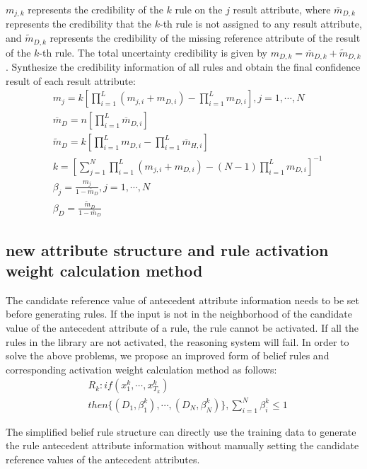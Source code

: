 \documentclass{ieeeaccess}
\begin{document}
$m_{j,k}$ represents the credibility of the $k$ rule on the $j$ result attribute,
where $\overline{m}_{D,k}$ represents the credibility that the $k$-th rule is not assigned to any result attribute,
and $\widetilde{m}_{D,k}$  represents the credibility of the missing reference attribute of the result of the $k$-th rule.
The total uncertainty credibility is given by $m_{D,k}=\overline{m}_{D,k}+\widetilde{m}_{D,k}$.
Synthesize the credibility information of all rules and obtain the final confidence result of each result attribute:
\begin{align}
     & m_j=k[\prod_{i=1}^L(m_{j,i}+m_{D,i})-\prod_{i=1}^Lm_{D,i}],j=1,\cdots,N       \\
     & \overline{m}_D=n[\prod_{i=1}^L\overline{m}_{D,i}]                             \\
     & \widetilde{m}_D=k[\prod_{i=1}^Lm_{D,i}-\prod_{i=1}^L\overline{m}_{H,i}]       \\
     & k=[\sum_{j=1}^N\prod_{i=1}^L(m_{j,i}+m_{D,i})-(N-1)\prod_{i=1}^Lm_{D,i}]^{-1} \\
     & \beta_j=\frac{m_j}{1-\overline{m}_D},j=1,\cdots,N                             \\
     & \beta_D=\frac{\widetilde{m}_D}{1-\overline{m}_D}
\end{align}

\subsection{new attribute structure and rule activation weight calculation method}
The candidate reference value of antecedent attribute information needs to be set before generating rules.
If the input is not in the neighborhood of the candidate value of the antecedent attribute of a rule, the rule cannot be activated.
If all the rules in the library are not activated, the reasoning system will fail.
In order to solve the above problems, we propose an improved form of belief rules and corresponding activation weight calculation method as follows:
\begin{equation}
    \begin{split}
        &R_k:if(x_1^k , \cdots , x_{T_k}^k)\\
        &then\{(D_1,\beta_1^k),\cdots,(D_N,\beta_N^k)\},\sum_{i=1}^N\beta_i^k\leq1
    \end{split}
\end{equation}

The simplified belief rule structure can directly use the training data to generate the rule antecedent attribute information without manually setting the candidate reference values of the antecedent attributes.
\end{document}
